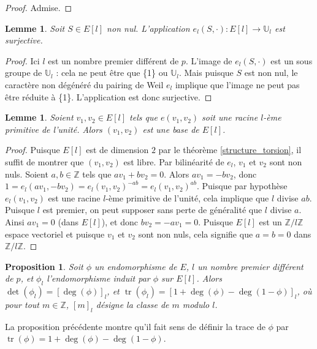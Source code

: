 \documentclass{article}
\theoremstyle{plain}%
\newtheorem{prop}[thm]{Proposition}
\newtheorem{lem}[thm]{Lemme}
\theoremstyle{definition}%
\newcommand{\Z}{\mathbb{Z}}
\newcommand{\U}{\mathbb{U}}
\DeclareMathOperator{\tr}{tr}
\begin{document}
\begin{proof}
  Admise.
\end{proof}

\begin{lem}
  \label{surj_el}
  Soit $S\in E[l]$ non nul. L'application $e_l(S,\cdot):E[l] \to \mathbb{U}_l$ est surjective.
\end{lem}

\begin{proof}
  Ici $l$ est un nombre premier différent de $p$. L'image de  $e_l(S,\cdot)$ est un sous groupe de $\mathbb{U}_l$ : cela ne peut être que \{1\} ou $\U_l$. Mais puisque $S$ est non nul, le caractère non dégénéré du pairing de Weil $e_l$ implique que l'image ne peut pas être réduite à \{1\}. L'application est donc surjective.
\end{proof}

\begin{lem}
  \label{pairing_base}
  Soient $v_1, v_2\in E[l]$ tels que $e(v_1, v_2)$ soit une racine $l$-ème primitive de l'unité. Alors $(v_1, v_2)$ est une base de $E[l]$. 
\end{lem}

\begin{proof}
  Puisque $E[l]$ est de dimension $2$ par le théorème \ref{structure_torsion}, il suffit de montrer que $(v_1, v_2)$ est libre. Par bilinéarité de $e_l$, $v_1$ et $v_2$ sont non nuls. Soient $a, b\in\Z$ tels que $av_1 + bv_2 = 0$. Alors $av_1 = -bv_2$, donc $1 = e_l(av_1, -bv_2) = e_l(v_1, v_2)^{-ab} = e_l(v_1, v_2)^{ab}$. Puisque par hypothèse $e_l(v_1, v_2)$ est une racine $l$-ème primitive de l'unité, cela implique que $l$ divise $ab$. Puisque $l$ est premier, on peut supposer sans perte de généralité que $l$ divise $a$. Ainsi $av_1 = 0$ (dans $E[l]$), et donc $bv_2=-av_1=0$. Puisque $E[l]$ est un $\Z/l\Z$ espace vectoriel et puisque $v_1$ et $v_2$ sont non nuls, cela signifie que $a=b=0$ dans $\Z/l\Z$.
\end{proof}

\begin{prop}
  \label{dettr}
  Soit $\phi$ un endomorphisme de $E$, $l$ un nombre premier différent de $p$, et $\phi_l$ l'endomorphisme induit par $\phi$ sur $E[l]$. Alors $\det(\phi_l) = [\deg(\phi)]_l$, et $\tr(\phi_l) = [1 + \deg(\phi) - \deg(1-\phi)]_l$, où pour tout $m\in\Z$, $[m]_l$ désigne la classe de $m$ modulo $l$. 
\end{prop}

La proposition précédente montre qu'il fait sens de définir la trace de $\phi$ par $\tr(\phi) = 1 + \deg(\phi) - \deg(1-\phi)$.
\end{document}
